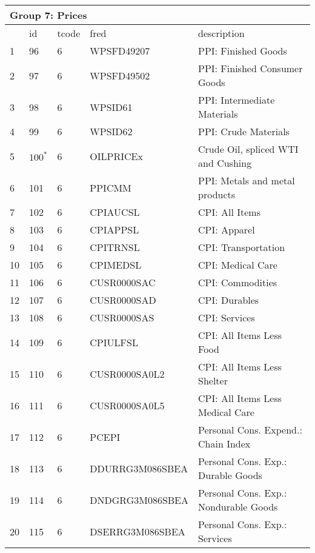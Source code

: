 \begin{table}[ht] 
\centering 
\begin{tabular}{lllll}
\multicolumn{5}{l}{Group 7: Prices} \\
\toprule
 & id & tcode & fred & description \\
\midrule
1 & 96 & 6 & WPSFD49207 & PPI: Finished Goods \\
2 & 97 & 6 & WPSFD49502 & PPI: Finished Consumer Goods \\
3 & 98 & 6 & WPSID61 & PPI: Intermediate Materials \\
4 & 99 & 6 & WPSID62 & PPI: Crude Materials \\
5 & $100^*$ & 6 & OILPRICEx & Crude Oil, spliced WTI and Cushing \\
6 & 101 & 6 & PPICMM & PPI: Metals and metal products \\
7 & 102 & 6 & CPIAUCSL & CPI: All Items \\
8 & 103 & 6 & CPIAPPSL & CPI: Apparel \\
9 & 104 & 6 & CPITRNSL & CPI: Transportation \\
10 & 105 & 6 & CPIMEDSL & CPI: Medical Care \\
11 & 106 & 6 & CUSR0000SAC & CPI: Commodities \\
12 & 107 & 6 & CUSR0000SAD & CPI: Durables \\
13 & 108 & 6 & CUSR0000SAS & CPI: Services \\
14 & 109 & 6 & CPIULFSL & CPI: All Items Less Food \\
15 & 110 & 6 & CUSR0000SA0L2 & CPI: All Items Less Shelter \\
16 & 111 & 6 & CUSR0000SA0L5 & CPI: All Items Less Medical Care \\
17 & 112 & 6 & PCEPI & Personal Cons. Expend.: Chain Index \\
18 & 113 & 6 & DDURRG3M086SBEA & Personal Cons. Exp.: Durable Goods \\
19 & 114 & 6 & DNDGRG3M086SBEA & Personal Cons. Exp.: Nondurable Goods \\
20 & 115 & 6 & DSERRG3M086SBEA & Personal Cons. Exp.: Services \\
\bottomrule
\end{tabular}  
\end{table} 